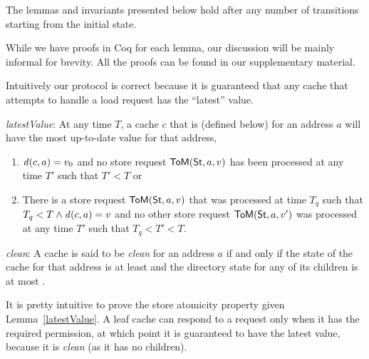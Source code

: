 

The lemmas and invariants presented below hold after any number of transitions
starting from the initial state.

While we have proofs in Coq for each lemma, our discussion will be mainly
informal for brevity. All the proofs can be found in our supplementary material.

Intuitively our protocol is correct because it is guaranteed that any cache that attempts to
handle a load request has the ``latest'' value.

\begin{lemma}
\textit{latestValue}:
At any time $T$, a cache $c$ that is \clean{} (defined below) for an address
$a$ will have the most up-to-date value for that address, \ie{}
\begin{enumerate}
\item $\mathit{d}(c,a) = v_0$ and no store request $\mathsf{ToM}(\mathsf{St}, a, v)$ has been processed at
any time $T'$ such that $T' < T$ or
\item There is a store request $\mathsf{ToM}(\mathsf{St}, a, v)$ that was processed at time $T_q$ such that
$T_q < T \wedge \mathit{d}(c,a) = v$ and no other store
request $\mathsf{ToM}(\mathsf{St}, a, v')$ was processed at any time $T'$ such that $T_q < T' < T$.
\end{enumerate}
\label{latestValue}
\end{lemma}

\vspace{-.15in}

\begin{defn}
\textit{clean}: A cache is said to be \textit{clean} for an address $a$ if and only if
the state of the cache for that address is at least \Sh{} and the directory 
state for any of its children is at most \Sh.
\label{clean}
\end{defn}

It is pretty intuitive to prove the store atomicity property given
Lemma~\ref{latestValue}. A leaf cache can respond to a request only when it
has the required permission, at which point it is guaranteed to have the latest
value, because it is \textit{clean} (as it has no children).

